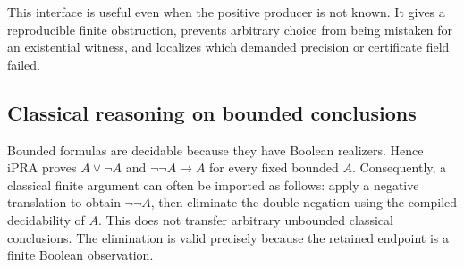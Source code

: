 This interface is useful even when the positive producer is not known.  It gives a reproducible finite obstruction, prevents arbitrary choice from being mistaken for an existential witness, and localizes which demanded precision or certificate field failed.

\subsection{Classical reasoning on bounded conclusions}

Bounded formulas are decidable because they have Boolean realizers.  Hence iPRA proves \(A\vee\neg A\) and \(\neg\neg A\to A\) for every fixed bounded \(A\).  Consequently, a classical finite argument can often be imported as follows: apply a negative translation to obtain \(\neg\neg A\), then eliminate the double negation using the compiled decidability of \(A\).  This does not transfer arbitrary unbounded classical conclusions.  The elimination is valid precisely because the retained endpoint is a finite Boolean observation.
